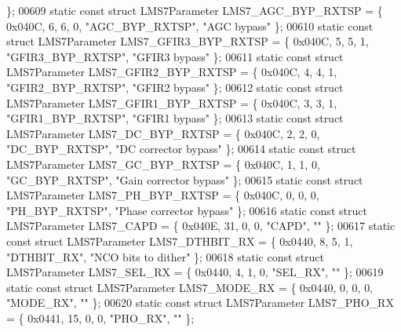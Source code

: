 \begin{DoxyCode}
      \};
00609 \textcolor{keyword}{static} \textcolor{keyword}{const} \textcolor{keyword}{struct }LMS7Parameter LMS7_AGC_BYP_RXTSP = \{ 0x040C, 6, 6, 0, \textcolor{stringliteral}{"AGC\_BYP\_RXTSP"}, \textcolor{stringliteral}{"AGC bypass"} \};
00610 \textcolor{keyword}{static} \textcolor{keyword}{const} \textcolor{keyword}{struct }LMS7Parameter LMS7_GFIR3_BYP_RXTSP = \{ 0x040C, 5, 5, 1, \textcolor{stringliteral}{"GFIR3\_BYP\_RXTSP"}, \textcolor{stringliteral}{"GFIR3
       bypass"} \};
00611 \textcolor{keyword}{static} \textcolor{keyword}{const} \textcolor{keyword}{struct }LMS7Parameter LMS7_GFIR2_BYP_RXTSP = \{ 0x040C, 4, 4, 1, \textcolor{stringliteral}{"GFIR2\_BYP\_RXTSP"}, \textcolor{stringliteral}{"GFIR2
       bypass"} \};
00612 \textcolor{keyword}{static} \textcolor{keyword}{const} \textcolor{keyword}{struct }LMS7Parameter LMS7_GFIR1_BYP_RXTSP = \{ 0x040C, 3, 3, 1, \textcolor{stringliteral}{"GFIR1\_BYP\_RXTSP"}, \textcolor{stringliteral}{"GFIR1
       bypass"} \};
00613 \textcolor{keyword}{static} \textcolor{keyword}{const} \textcolor{keyword}{struct }LMS7Parameter LMS7_DC_BYP_RXTSP = \{ 0x040C, 2, 2, 0, \textcolor{stringliteral}{"DC\_BYP\_RXTSP"}, \textcolor{stringliteral}{"DC corrector
       bypass"} \};
00614 \textcolor{keyword}{static} \textcolor{keyword}{const} \textcolor{keyword}{struct }LMS7Parameter LMS7_GC_BYP_RXTSP = \{ 0x040C, 1, 1, 0, \textcolor{stringliteral}{"GC\_BYP\_RXTSP"}, \textcolor{stringliteral}{"Gain corrector
       bypass"} \};
00615 \textcolor{keyword}{static} \textcolor{keyword}{const} \textcolor{keyword}{struct }LMS7Parameter LMS7_PH_BYP_RXTSP = \{ 0x040C, 0, 0, 0, \textcolor{stringliteral}{"PH\_BYP\_RXTSP"}, \textcolor{stringliteral}{"Phase corrector
       bypass"} \};
00616 \textcolor{keyword}{static} \textcolor{keyword}{const} \textcolor{keyword}{struct }LMS7Parameter LMS7_CAPD = \{ 0x040E, 31, 0, 0, \textcolor{stringliteral}{"CAPD"}, \textcolor{stringliteral}{""} \};
00617 \textcolor{keyword}{static} \textcolor{keyword}{const} \textcolor{keyword}{struct }LMS7Parameter LMS7_DTHBIT_RX = \{ 0x0440, 8, 5, 1, \textcolor{stringliteral}{"DTHBIT\_RX"}, \textcolor{stringliteral}{"NCO bits to dither"} \};
00618 \textcolor{keyword}{static} \textcolor{keyword}{const} \textcolor{keyword}{struct }LMS7Parameter LMS7_SEL_RX = \{ 0x0440, 4, 1, 0, \textcolor{stringliteral}{"SEL\_RX"}, \textcolor{stringliteral}{""} \};
00619 \textcolor{keyword}{static} \textcolor{keyword}{const} \textcolor{keyword}{struct }LMS7Parameter LMS7_MODE_RX = \{ 0x0440, 0, 0, 0, \textcolor{stringliteral}{"MODE\_RX"}, \textcolor{stringliteral}{""} \};
00620 \textcolor{keyword}{static} \textcolor{keyword}{const} \textcolor{keyword}{struct }LMS7Parameter LMS7_PHO_RX = \{ 0x0441, 15, 0, 0, \textcolor{stringliteral}{"PHO\_RX"}, \textcolor{stringliteral}{""} \};

\end{DoxyCode}
